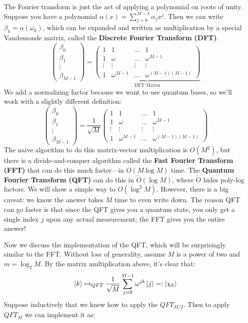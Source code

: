 The Fourier transform is just the act of applying a polynomial on roots of unity.
Suppose you have a polynomial $\alpha(x) = \sum_{j = 0}^{M - 1} \alpha_j x^j$. Then we can
write $\beta_k = \alpha(\omega_k)$, which can be expanded and written as multiplication
by a special Vandemonde matrix, called the \textbf{Discrete Fourier Transform (DFT)}.
\[ \begin{pmatrix}
    \beta_0 \\ \beta_1 \\ \vdots \\ \beta_{M - 1}
\end{pmatrix} = \underbrace{\begin{pmatrix}
    1 & 1 & \dots & 1 \\
    1 & \omega & \dots & \omega^{M - 1} \\
    \vdots & \vdots & \vdots & \vdots \\
    1 & \omega^{M - 1} & \dots & \omega^{(M - 1)(M - 1)}
\end{pmatrix}}_{\text{DFT Matrix}} \]
We add a normalizing factor because we want to 
use quantum bases, so we'll work with a slightly different definition:
\[ \begin{pmatrix}
    \beta_0 \\ \beta_1 \\ \vdots \\ \beta_{M - 1}
\end{pmatrix} = \frac{1}{\sqrt{M}} \begin{pmatrix}
    1 & 1 & \dots & 1 \\
    1 & \omega & \dots & \omega^{M - 1} \\
    \vdots & \vdots & \vdots & \vdots \\
    1 & \omega^{M - 1} & \dots & \omega^{(M - 1)(M - 1)}
\end{pmatrix} \]
The naive algorithm to do this matrix-vector multiplication is $O(M^2)$, but there is a
divide-and-conquer algorithm called the \textbf{Fast Fourier Transform (FFT)} that can do this much faster—in $O(M \log M)$ time.
The \textbf{Quantum Fourier Transform (QFT)} can do this in $\tilde{O}(\log M)$,
where $\tilde{O}$ hides poly-log factors. We will show a simple way to $O(\log^2 M)$. However,
there is a big caveat: we know the answer takes $M$ time to even write down.
The reason QFT can go faster is that since the QFT gives you a quantum state,
you only get a single index $j$ upon any actual measurement; the FFT gives you the entire answer!

Now we discuss the implementation of the QFT, which will be surprisingly similar to the FFT. Without loss of generality,
assume $M$ is a power of two and $m = \log_2 M$. By the matrix multiplication above, it's clear that:
\[\ket{k} \mapsto_{QFT} \frac{1}{\sqrt{M}} \sum_{j = 0}^{M - 1} \omega^{jk} \ket{j} =: \ket{\chi_k} \]
Suppose inductively that we knew how to apply the $QFT_{M/2}$. Then to apply $QFT_M$ we can implement it as:

